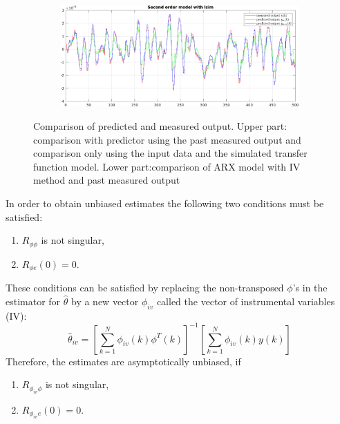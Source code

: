 \begin{figure}[h!]
\begin{subfigure}{.49\textwidth}
		\label{fig:output_lsim2}
	\end{subfigure}
	\begin{subfigure}{\textwidth}
		\vspace*{1cm}
		\includegraphics[width=\textwidth]{figures/arx_iv.pdf}
		 \label{fig:output_arx_iv}
	\end{subfigure}
	\caption{Comparison of predicted and measured output. Upper part: comparison with predictor using the past measured output and comparison only using the input data and the simulated transfer function model. Lower part:comparison of ARX model with IV method and past measured output}
\end{figure}
In order to obtain unbiased estimates the following two conditions must be satisfied: 
\begin{enumerate}
\item $R_{\phi \phi}$ is not singular,
\item $R_{\phi e }(0) = 0$.
\end{enumerate}
These conditions can be satisfied by replacing the non-transposed $\phi$'s in the estimator for $\hat{\theta}$ by a new vector $\phi_{iv}$ called the vector of  instrumental variables (IV):
\begin{equation}
	\hat{\theta}_{iv} = \left[ \sum\limits_{k=1}^N \phi_{iv}(k)\phi^T(k) \right]^{-1} \left[\sum\limits_{k=1}^N \phi_{iv}(k) y(k) \right]
\end{equation}
Therefore, the estimates are asymptotically unbiased, if 
\begin{enumerate}
	\item $R_{\phi_{iv} \phi}$ is not singular,
	\item $R_{\phi_{iv} e }(0) = 0$.
\end{enumerate}
